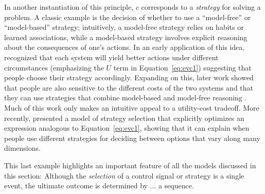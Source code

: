 In another instantiation of this principle, $c$ corresponds to a \emph{strategy} for solving a problem. A classic example is the decision of whether to use a ``model-free'' or ``model-based'' strategy; intuitively, a model-free strategy relies on habits or learned associations, while a model-based strategy involves explicit reasoning about the consequences of one's actions. In an early application of this idea, \citep{daw2005uncertaintybased} recognized that each system will yield better actions under different circumstances (emphasizing the $U$ term in Equation~\ref{eq:evc1}) suggesting that people choose their strategy accordingly. Expanding on this, later work showed that people are also sensitive to the different costs of the two systems \citep{keramati2011speed,kool2017costbenefit} and that they can use strategies that combine model-based and model-free reasoning \citep{keramati2016adaptive,huys2015interplay}. Much of this work only makes an intuitive appeal to a utility-cost tradeoff. More recently, \citet{lieder2017strategy} presented a model of strategy selection that explicitly optimizes an expression analogous to Equation~\ref{eq:evc1}, showing that it can explain when people use different strategies for deciding between options that vary along many dimensions.

This last example highlights an important feature of all the models discussed in this section: Although the \emph{selection} of a control signal or strategy is a single event, the ultimate outcome is determined by ... a sequence.




